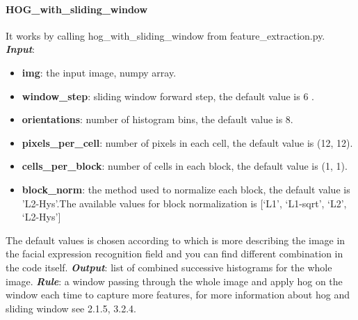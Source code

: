 \paragraph{HOG\_with\_sliding\_window}
It works by calling hog\_with\_sliding\_window from feature\_extraction.py.
\newline \textbf{\textit{Input}}: 
\begin{itemize}
\item  \textbf{img}: the input image, numpy array.
\item  \textbf{window\_step}: sliding window forward step, the default value is 6 .
\item  \textbf{orientations}: number of histogram bins, the default value is 8.
\item \textbf{pixels\_per\_cell}: number of pixels in each cell, the default value is (12, 12).
\item  \textbf{cells\_per\_block}: number of cells in each block, the default value is (1, 1).
\item  \textbf{block\_norm}: the method used to normalize each block, the default value is 'L2-Hys'.\newline The available values for block normalization is [‘L1’, ‘L1-sqrt’, ‘L2’, ‘L2-Hys’]
\end{itemize}
The default values is chosen according to which is more describing the image in the facial expression recognition field and you can find different combination in the code itself. 
\newline \textbf{\textit{Output}}: list of combined successive histograms for the whole image.
\newline\textbf{\textit{Rule}}: a window passing through the whole image and apply hog on the window each time to capture more features, for more information about hog and sliding window see 2.1.5, 3.2.4.
\newline 